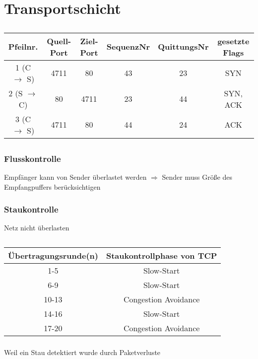 \documentclass[a4paper]{article}
\begin{document}
\section{Transportschicht}
\subsection{}
\begin{tabular}{|c|c|c|c|c|c|}\hline
Pfeilnr. & Quell-Port & Ziel-Port & SequenzNr & QuittungsNr & gesetzte Flags \\ \hline
1 (C $\rightarrow$ S)&4711&80&43&23&SYN\\ \hline
2 (S $\rightarrow$ C)&80&4711&23&44&SYN, ACK\\ \hline
3 (C $\rightarrow$ S)&4711&80&44&24&ACK\\ \hline
\end{tabular}
\subsection{}
\subsubsection{Flusskontrolle}
Empfänger kann von Sender überlastet werden
$\Rightarrow$ Sender muss Größe des Empfangpuffers berücksichtigen
\subsubsection{Staukontrolle}
Netz nicht überlasten
\subsection{}
\subsubsection{}
\begin{tabular}{|c|c|}\hline
Übertragungsrunde(n) & Staukontrollphase von TCP \\ \hline
1-5 & Slow-Start\\ \hline
6-9 & Slow-Start\\ \hline
10-13 & Congestion Avoidance\\ \hline
14-16 & Slow-Start\\ \hline
17-20 & Congestion Avoidance\\ \hline
\end{tabular}
\subsubsection{}
Weil ein Stau detektiert wurde durch Paketverluste
\end{document}
